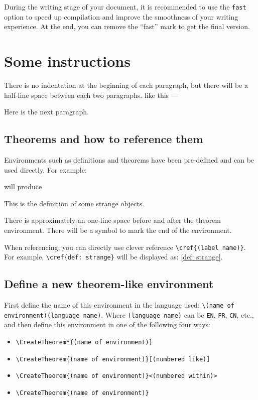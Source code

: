 \documentclass{simplivre}
\begin{document}
During the writing stage of your document, it is recommended to use the \verb|fast| option to speed up compilation and improve the smoothness of your writing experience. At the end, you can remove the ``fast'' mark to get the final version.

\chapter{Some instructions}

There is no indentation at the beginning of each paragraph, but there will be a half-line space between each two paragraphs. like this ---

Here is the next paragraph.

\section{Theorems and how to reference them}

Environments such as definitions and theorems have been pre-defined and can be used directly. For example:


There is approximately an one-line space before and after the theorem environment. There will be a symbol to mark the end of the environment.

When referencing, you can directly use clever reference \lstinline|\cref{(label name)}|. For example, \lstinline|\cref{def: strange}| will be displayed as: \cref{def: strange}.

\section{Define a new theorem-like environment}

First define the name of this environment in the language used: \lstinline|\(name of environment)(language name)|. Where \lstinline|(language name)| can be \lstinline|EN|, \lstinline|FR|, \lstinline|CN|, etc., and then define this environment in one of the following four ways:
\begin{itemize}
    \item \lstinline|\CreateTheorem*{(name of environment)}|
    \item \lstinline|\CreateTheorem{(name of environment)}[(numbered like)]|
    \item \lstinline|\CreateTheorem{(name of environment)}<(numbered within)>|
    \item \lstinline|\CreateTheorem{(name of environment)}|
\end{itemize}
\end{document}
